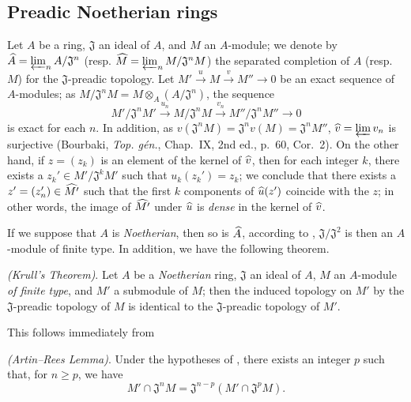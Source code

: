 \subsection{Preadic Noetherian rings}
\label{subsection:0.7.3}

\begin{env}[7.3.1]
\label{0.7.3.1}
Let $A$ be a ring, $\mathfrak{J}$ an ideal of $A$, and $M$ an $A$-module; we denote by
$\widehat{A}=\varprojlim_n A/\mathfrak{J}^n$
(resp. $\widehat{M}=\varprojlim_n M/\mathfrak{J}^n M$) the separated completion of $A$
(resp. $M$) for the $\mathfrak{J}$-preadic topology. Let
$M'\xrightarrow{u}M\xrightarrow{v}M''\to 0$ be an exact sequence of $A$-modules; as
$M/\mathfrak{J}^n M=M\otimes_A(A/\mathfrak{J}^n)$, the sequence
\[
  M'/\mathfrak{J}^n M'\xrightarrow{u_n}M/\mathfrak{J}^n M\xrightarrow{v_n}M''/\mathfrak{J}^n M''\to 0
\]
is exact for each $n$. In addition, as
$v(\mathfrak{J}^n M)=\mathfrak{J}^n v(M)=\mathfrak{J}^n M''$,
$\widehat{v}=\varprojlim v_n$ is surjective (Bourbaki, \emph{Top. g\'en.}, Chap.~IX,
2nd ed., p.~60, Cor.~2). On the other hand, if $z=(z_k)$ is an element of the kernel of
$\widehat{v}$, then for each integer $k$, there exists a $z_k'\in M'/\mathfrak{J}^k M'$
such that $u_k(z_k')=z_k$; we conclude that there exists  a $z'=(z_n')\in\widehat{M'}$
such that the first $k$ components of $\widehat{u}(z')$ coincide with the $z$; in other
words, the image of $\widehat{M'}$ under $\widehat{u}$ is \emph{dense} in the kernel of
$\widehat{v}$.

If we suppose that $A$ is \emph{Noetherian}, then so is $\widehat{A}$, according to
, $\mathfrak{J}/\mathfrak{J}^2$ is then an $A$-module of
finite type. In addition, we have the following theorem.
\end{env}

\begin{theorem}[7.3.2]
\label{0.7.3.2}
\emph{(Krull's Theorem)}. Let $A$ be a \emph{Noetherian} ring, $\mathfrak{J}$ an ideal of
$A$, $M$ an $A$-module \emph{of finite type}, and $M'$ a submodule of $M$; then the induced
topology on $M'$ by the $\mathfrak{J}$-preadic topology of $M$ is identical to the
$\mathfrak{J}$-preadic topology of $M'$.
\end{theorem}

This follows immediately from
\begin{lemma}[7.3.2.1]
\label{0.7.3.2.1}
\emph{(Artin--Rees Lemma)}. Under the hypotheses of , there
exists an integer $p$ such that, for $n\geq p$, we have
\[
  M'\cap\mathfrak{J}^n M=\mathfrak{J}^{n-p}(M'\cap\mathfrak{J}^p M).
\]
\end{lemma}

